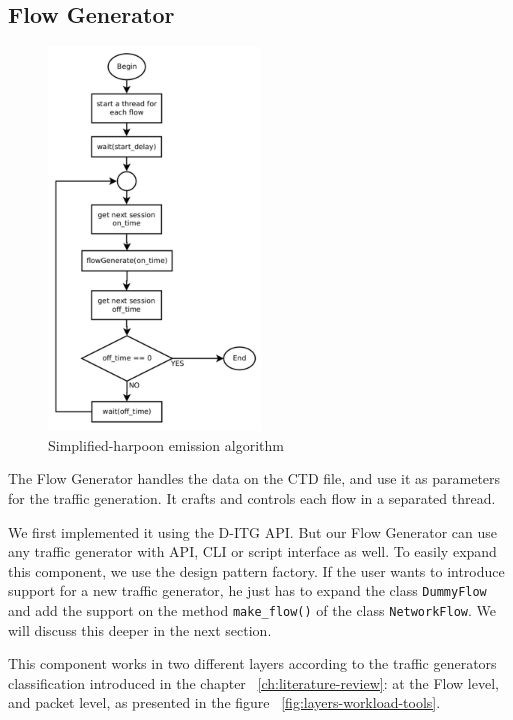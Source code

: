 \subsection{Flow Generator}

\begin{figure}[ht!]
    \centering
    \includegraphics[height=4.0in]{figures/ch3/alg-simplified-harpoon}
    \caption{Simplified-harpoon emission algorithm}
    \label{fig:alg-simplified-harpoon}
\end{figure}

The Flow Generator handles the data on the CTD file, and use it as parameters for the traffic generation. It crafts and controls each flow in a separated thread. 

We first implemented it using the D-ITG API. But our Flow Generator can use any traffic generator with API, CLI or script interface as well. To easily expand this component, we use the design pattern factory. If the user wants to introduce support for a new traffic generator, he just has to expand the class \texttt{DummyFlow} and add the support on the method \texttt{make\_flow()} of the class \texttt{NetworkFlow}. We will discuss this deeper in the next section.

This component works in two different layers according to the traffic generators classification introduced in the chapter ~\ref{ch:literature-review}: at the Flow level, and packet level, as presented in the figure ~\ref{fig:layers-workload-tools}. 

